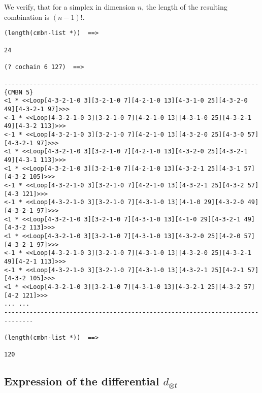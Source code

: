 We verify, that for a simplex in dimension $n$, the length of the resulting
combination is $(n-1)!$.
{\footnotesize\begin{verbatim}
(length(cmbn-list *))  ==>

24

(? cochain 6 127)  ==>

----------------------------------------------------------------------{CMBN 5}
<1 * <<Loop[4-3-2-1-0 3][3-2-1-0 7][4-2-1-0 13][4-3-1-0 25][4-3-2-0 49][4-3-2-1 97]>>>
<-1 * <<Loop[4-3-2-1-0 3][3-2-1-0 7][4-2-1-0 13][4-3-1-0 25][4-3-2-1 49][4-3-2 113]>>>
<-1 * <<Loop[4-3-2-1-0 3][3-2-1-0 7][4-2-1-0 13][4-3-2-0 25][4-3-0 57][4-3-2-1 97]>>>
<1 * <<Loop[4-3-2-1-0 3][3-2-1-0 7][4-2-1-0 13][4-3-2-0 25][4-3-2-1 49][4-3-1 113]>>>
<1 * <<Loop[4-3-2-1-0 3][3-2-1-0 7][4-2-1-0 13][4-3-2-1 25][4-3-1 57][4-3-2 105]>>>
<-1 * <<Loop[4-3-2-1-0 3][3-2-1-0 7][4-2-1-0 13][4-3-2-1 25][4-3-2 57][4-3 121]>>>
<-1 * <<Loop[4-3-2-1-0 3][3-2-1-0 7][4-3-1-0 13][4-1-0 29][4-3-2-0 49][4-3-2-1 97]>>>
<1 * <<Loop[4-3-2-1-0 3][3-2-1-0 7][4-3-1-0 13][4-1-0 29][4-3-2-1 49][4-3-2 113]>>>
<1 * <<Loop[4-3-2-1-0 3][3-2-1-0 7][4-3-1-0 13][4-3-2-0 25][4-2-0 57][4-3-2-1 97]>>>
<-1 * <<Loop[4-3-2-1-0 3][3-2-1-0 7][4-3-1-0 13][4-3-2-0 25][4-3-2-1 49][4-2-1 113]>>>
<-1 * <<Loop[4-3-2-1-0 3][3-2-1-0 7][4-3-1-0 13][4-3-2-1 25][4-2-1 57][4-3-2 105]>>>
<1 * <<Loop[4-3-2-1-0 3][3-2-1-0 7][4-3-1-0 13][4-3-2-1 25][4-3-2 57][4-2 121]>>>
... ...
------------------------------------------------------------------------------

(length(cmbn-list *))  ==>

120
\end{verbatim}}

\subsection {Expression of the differential $d_{\otimes t}$}

